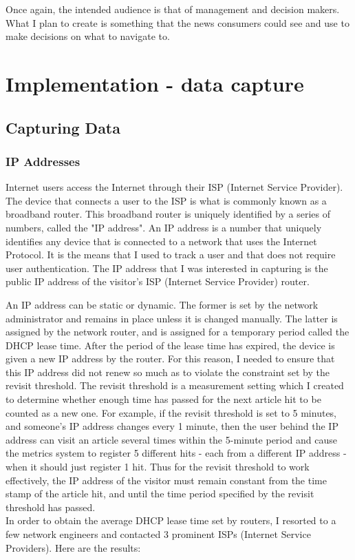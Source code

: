 \documentclass[12pt]{article}
\begin{document}
Once again, the intended audience is that of management and decision makers. What I plan to create is something that the news consumers could see and use to make decisions on what to navigate to.

\null
\vfill


\section{Implementation - data capture}
\subsection{Capturing Data}
\subsubsection{IP Addresses}
Internet users access the Internet through their ISP (Internet Service Provider). The device that connects a user to the ISP is what is commonly known as a broadband router. This broadband router is uniquely identified by a series of numbers, called the "IP address". An IP address is a number that uniquely identifies any device that is connected to a network that uses the Internet Protocol. It is the means that I used to track a user and that does not require user authentication. The IP address that I was interested in capturing is the public IP address of the visitor's ISP (Internet Service Provider) router. 

An IP address can be static or dynamic. The former is set by the network administrator and remains in place unless it is changed manually. The latter is assigned by the network router, and is assigned for a temporary period called the DHCP lease time. After the period of the lease time has expired, the device is given a new IP address by the router. For this reason, I needed to ensure that this IP address did not renew so much as to violate the constraint set by the revisit threshold. The revisit threshold is a measurement setting which I created to determine whether enough time has passed for the next article hit to be counted as a new one. For example, if the revisit threshold is set to 5 minutes, and someone's IP address changes every 1 minute, then the user behind the IP address can visit an article several times within the 5-minute period and cause the metrics system to register 5 different hits - each from a different IP address - when it should just register 1 hit. Thus for the revisit threshold to work effectively, the IP address of the visitor must remain constant from the time stamp of the article hit, and until the time period specified by the revisit threshold has passed. \\
In order to obtain the average DHCP lease time set by routers, I resorted to a few network engineers and contacted 3 prominent ISPs (Internet Service Providers). Here are the results:
\vspace{0.3in}
\end{document}
